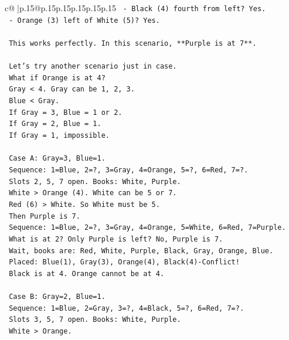 \documentclass{article}
\begin{document}
{\begin{supertabular}{c@{$\;$}|p{.15\linewidth}@{}p{.15\linewidth}p{.15\linewidth}p{.15\linewidth}p{.15\linewidth}p{.15\linewidth}}
{{{\texttt{       {-} Black (4) fourth from left? Yes.} \\
\texttt{       {-} Orange (3) left of White (5)? Yes.} \\
\\ 
\texttt{       This works perfectly. In this scenario, **Purple is at 7**.} \\
\\ 
\texttt{    Let's try another scenario just in case.} \\
\texttt{    What if Orange is at 4?} \\
\texttt{       Gray < 4. Gray can be 1, 2, 3.} \\
\texttt{       Blue < Gray.} \\
\texttt{       If Gray = 3, Blue = 1 or 2.} \\
\texttt{       If Gray = 2, Blue = 1.} \\
\texttt{       If Gray = 1, impossible.} \\
\\ 
\texttt{       Case A: Gray=3, Blue=1.} \\
\texttt{          Sequence: 1=Blue, 2=?, 3=Gray, 4=Orange, 5=?, 6=Red, 7=?.} \\
\texttt{          Slots 2, 5, 7 open. Books: White, Purple.} \\
\texttt{          White > Orange (4). White can be 5 or 7.} \\
\texttt{          Red (6) > White. So White must be 5.} \\
\texttt{          Then Purple is 7.} \\
\texttt{          Sequence: 1=Blue, 2=?, 3=Gray, 4=Orange, 5=White, 6=Red, 7=Purple.} \\
\texttt{          What is at 2? Only Purple is left? No, Purple is 7.} \\
\texttt{          Wait, books are: Red, White, Purple, Black, Gray, Orange, Blue.} \\
\texttt{          Placed: Blue(1), Gray(3), Orange(4), Black(4){-}Conflict!} \\
\texttt{          Black is at 4. Orange cannot be at 4.} \\
\\ 
\texttt{       Case B: Gray=2, Blue=1.} \\
\texttt{          Sequence: 1=Blue, 2=Gray, 3=?, 4=Black, 5=?, 6=Red, 7=?.} \\
\texttt{          Slots 3, 5, 7 open. Books: White, Purple.} \\
\texttt{          White > Orange.} \\
}}}
\end{supertabular}}
\end{document}

